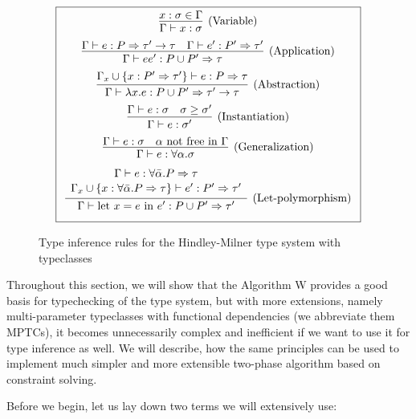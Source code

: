 \begin{figure}
    \caption{Type inference rules for the Hindley-Milner type system with typeclasses}
    \label{fig:wRules}
    $$\boxed{\renewcommand{\arraystretch}{2.2}\begin{array}{cc}
        \infer[\text{(Variable)}]{\Gamma \vdash x : \sigma}{x : \sigma \in \Gamma} \\
        \infer[\text{(Application)}]{\Gamma \vdash e e' : {P} \cup {P'}  \Rightarrow \tau}{\Gamma \vdash e : {P} \Rightarrow \tau' \rightarrow \tau & \Gamma \vdash e' : {P'} \Rightarrow \tau'} \\
        \infer[\text{(Abstraction)}]{\Gamma \vdash \lambda x . e : {P} \cup {P'} \Rightarrow \tau' \rightarrow \tau}{\Gamma_x \cup \{x : {P'} \Rightarrow \tau'\} \vdash e : {P} \Rightarrow \tau} \\
        \infer[\text{(Instantiation)}]{\Gamma \vdash e : \sigma'}{\Gamma \vdash e : \sigma & \sigma \geq \sigma'}\\
        \infer[\text{(Generalization)}]{\Gamma \vdash e : \forall \alpha . \sigma}{\Gamma \vdash e : \sigma & \alpha \text{ not free in }\Gamma}\\
        \infer[\text{(Let-polymorphism)}]{\Gamma \vdash \text{let } x = e \text{ in } e' : {P} \cup {P'} \Rightarrow \tau'}{\renewcommand{\arraystretch}{1.1}\begin{array}{c}\Gamma \vdash e : \forall \bar{\alpha} . {P} \Rightarrow \tau \\ \Gamma_x \cup \{x :\forall \bar{\alpha} .  {P} \Rightarrow \tau \} \vdash e' : {P'} \Rightarrow \tau'\end{array}}
    \end{array}}$$
\end{figure}

Throughout this section, we will show that the Algorithm W provides a good basis for typechecking of the type system, but with more extensions, namely multi-parameter typeclasses with functional dependencies \cite{jones2000type} (we abbreviate them MPTCs), it becomes unnecessarily complex and inefficient if we want to use it for type inference as well. We will describe, how the same principles can be used to implement much simpler and more extensible two-phase algorithm based on constraint solving.

Before we begin, let us lay down two terms we will extensively use:

